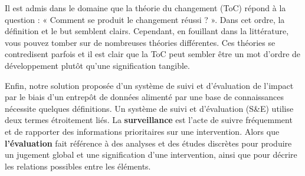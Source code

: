 Il est admis dans le domaine que la théorie du changement (ToC) répond à la question : « Comment se produit le changement réussi ? ». Dans cet ordre, la définition et le but semblent clairs. Cependant, en fouillant dans la littérature, vous pouvez tomber sur de nombreuses théories différentes. Ces théories se contredisent parfois et il est clair que la ToC peut sembler être un mot d'ordre de développement plutôt qu'une signification tangible\cite{stein_understanding_2012}. 

Enfin, notre solution proposée d'un système de suivi et d'évaluation de l'impact par le biais d'un entrepôt de données alimenté par une base de connaissances nécessite quelques définitions. Un système de suivi et d'évaluation (S\&E) utilise deux termes étroitement liés. La \textbf{surveillance} est l'acte de suivre fréquemment et de rapporter des informations prioritaires sur une intervention. Alors que \textbf{l'évaluation} fait référence à des analyses et des études discrètes pour produire un jugement global et une signification d'une intervention, ainsi que pour décrire les relations possibles entre les éléments.